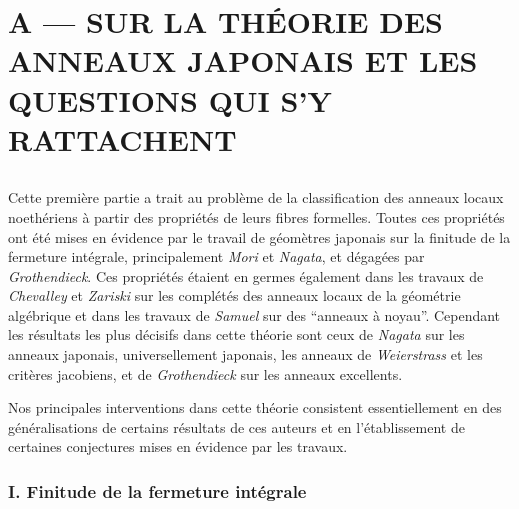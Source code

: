 \chapter*{A --- SUR LA THÉORIE DES ANNEAUX JAPONAIS ET LES QUESTIONS QUI S'Y RATTACHENT}\thispagestyle{empty}
\label{sec:a}
\section*{}

Cette première partie a trait au problème de la classification des anneaux locaux noethériens à partir des propriétés de leurs fibres formelles. Toutes ces propriétés ont été mises en évidence par le travail de géomètres japonais sur la finitude de la fermeture intégrale, principalement \emph{Mori} et \emph{Nagata}, et dégagées par \emph{Grothendieck}. Ces propriétés étaient en germes également dans les travaux de \emph{Chevalley} et \emph{Zariski} sur les complétés des anneaux locaux de la géométrie algébrique et dans les travaux de \emph{Samuel} sur des ``anneaux à noyau''. Cependant les résultats les plus décisifs dans cette théorie sont ceux de \emph{Nagata} sur les anneaux japonais, universellement japonais, les anneaux de \emph{Weierstrass} et les critères jacobiens, et de \emph{Grothendieck} sur les anneaux excellents.

Nos principales interventions dans cette théorie consistent essentiellement en des généralisations de certains résultats de ces auteurs et en l’établissement de certaines conjectures mises en évidence par les travaux.

\subsection*{I. Finitude de la fermeture intégrale}\label{sec:1}%

